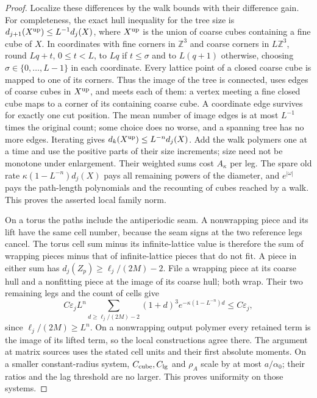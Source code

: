 \documentclass[11pt,letterpaper,reqno]{amsart}
\theoremstyle{definition}
\theoremstyle{remark}
\begin{document}
\begin{proof}
Localize these differences by the walk bounds with their
difference gain.  For completeness, the exact hull inequality
for the tree size is $d_{j+1}(X^{\rm up})\le L^{-1}d_j(X)$,
where $X^{\rm up}$ is the union of coarse cubes containing a
fine cube of $X$. In coordinates with fine corners in
$\mathbb Z^3$ and coarse corners in $L\mathbb Z^3$, round
$Lq+t$, $0\le t<L$, to $Lq$ if $t\le\sigma$ and to
$L(q+1)$ otherwise, choosing $\sigma\in\{0,\ldots,L-1\}$
in each coordinate. Every lattice point of a closed coarse cube is
mapped to one of its corners. Thus the image of the tree is connected,
uses edges of coarse cubes in $X^{\rm up}$, and meets each of
them: a vertex meeting a fine closed cube maps to a corner of
its containing coarse cube. A coordinate edge survives for
exactly one cut position. The mean number of image edges is
at most $L^{-1}$ times the original count; some choice does
no worse, and a spanning tree has no more edges.
Iterating gives $d_k(X^{\rm up})\le L^{-n}d_j(X)$.
Add the walk polymers one at a time and use the positive
parts of their size increments; size need not be monotone
under enlargement.  Their weighted sums cost $A_\kappa$ per
leg.  The spare old rate
$\kappa(1-L^{-n})d_j(X)$ pays all remaining powers of the
diameter, and $e^{|\omega|}$ pays the path-length polynomials
and the recounting of cubes reached by a walk.  This proves
the asserted local family norm.

On a torus the paths include the antiperiodic seam.  A
nonwrapping piece and its lift have the same cell number,
because the seam signs at the two reference legs cancel.
The torus cell sum minus its infinite-lattice value is
therefore the sum of wrapping pieces minus that of
infinite-lattice pieces that do not fit.  A piece in
either sum has $d_j(Z_p)\ge\ell_j/(2M)-2$.
File a wrapping piece at its coarse hull and a nonfitting
piece at the image of its coarse hull; both wrap.
Their two remaining legs and the count of cells give
\[
 C\varepsilon_jL^n\sum_{d\ge\ell_j/(2M)-2}(1+d)^3
       e^{-\kappa(1-L^{-n})d}\le C\varepsilon_j,
\]
since $\ell_j/(2M)\ge L^n$.  On a nonwrapping output
polymer every retained term is the image of its lifted
term, so the local constructions agree there.
The argument at matrix sources uses the stated cell
units and their first absolute moments.  On a smaller
constant-radius system, $C_{\rm cube},C_{\rm lg}$ and
$\rho_A$ scale by at most $a/\alpha_0$; their ratios and
the lag threshold are no larger.  This proves uniformity
on those systems.
\end{proof}
\end{document}
